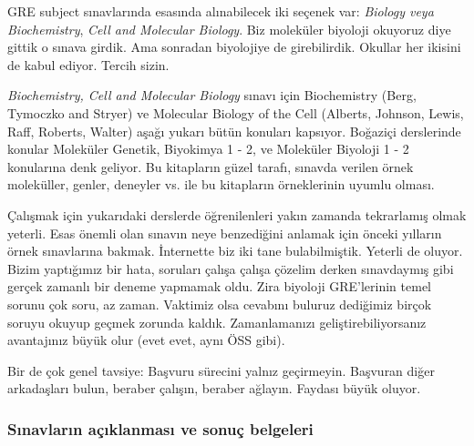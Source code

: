 \documentclass[12pt]{article}
\theoremstyle{break}
\begin{document}
GRE subject sınavlarında esasında alınabilecek iki seçenek var: \textit{Biology veya Biochemistry}, \textit{Cell and Molecular Biology}. Biz moleküler biyoloji okuyoruz diye gittik o sınava girdik. Ama sonradan biyolojiye de girebilirdik. Okullar her ikisini de kabul ediyor. Tercih sizin.

\textit{Biochemistry, Cell and Molecular Biology} sınavı için Biochemistry (Berg, Tymoczko and Stryer) ve Molecular Biology of the Cell (Alberts, Johnson, Lewis, Raff, Roberts, Walter) aşağı yukarı bütün konuları kapsıyor. Boğaziçi derslerinde konular Moleküler Genetik, Biyokimya 1 - 2, ve Moleküler Biyoloji 1 - 2 konularına denk geliyor. Bu kitapların güzel tarafı, sınavda verilen örnek moleküller, genler, deneyler vs. ile bu kitapların örneklerinin uyumlu olması. 

Çalışmak için yukarıdaki derslerde öğrenilenleri yakın zamanda tekrarlamış olmak yeterli. Esas önemli olan sınavın neye benzediğini anlamak için önceki yılların örnek sınavlarına bakmak. İnternette biz iki tane bulabilmiştik. Yeterli de oluyor. Bizim yaptığımız bir hata, soruları çalışa çalışa çözelim derken sınavdaymış gibi gerçek zamanlı bir deneme yapmamak oldu. Zira biyoloji GRE’lerinin temel sorunu çok soru, az zaman. Vaktimiz olsa cevabını buluruz dediğimiz birçok soruyu okuyup geçmek zorunda kaldık. Zamanlamanızı geliştirebiliyorsanız avantajınız büyük olur (evet evet, aynı ÖSS gibi). 

Bir de çok genel tavsiye: Başvuru sürecini yalnız geçirmeyin. Başvuran diğer arkadaşları bulun, beraber çalışın, beraber ağlayın. Faydası büyük oluyor. 

\subsubsection{Sınavların açıklanması ve sonuç belgeleri}
\end{document}
